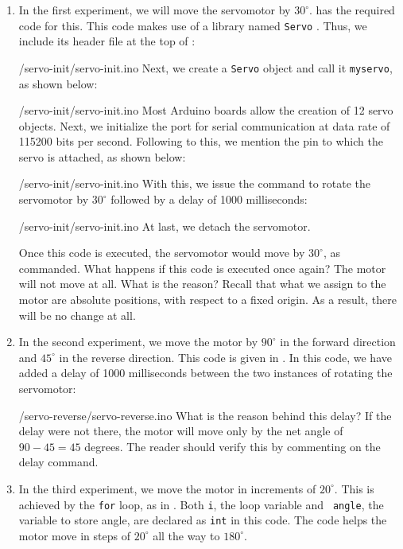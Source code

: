 \begin{enumerate}
  \item In the first experiment, we will move the servomotor by
        $30^\circ$.  has the required code for this.  
        This code makes use of a library named {\tt Servo} \cite{servo-lib}. 
        Thus, we include its header file at the top of :
        
        {\LocSERardcode/servo-init/servo-init.ino}
        Next, we create a {\tt Servo} object and call it {\tt myservo}, as shown below:
        
        {\LocSERardcode/servo-init/servo-init.ino}
        Most Arduino boards allow the creation of 12 servo objects. Next, we initialize the port for serial communication at
        data rate of 115200 bits per second. Following to this, we mention the 
        pin to which the servo is attached, as shown below:
        
        {\LocSERardcode/servo-init/servo-init.ino}
        With this, we issue the command to rotate the servomotor by $30^\circ$ followed by a delay of 
        1000 milliseconds:
        
        {\LocSERardcode/servo-init/servo-init.ino}
        At last, we  detach the servomotor.    
        
        Once this code is executed, the servomotor would move by
        $30^\circ$, as commanded.  What happens if this code is executed
        once again?  The motor will not move at all.  What is the reason?
        Recall that what we assign to the motor are absolute positions, with
        respect to a fixed origin.  As a result, there will be no change at
        all. 
        
  \item In the second experiment, we move the motor by $90^\circ$ in the
        forward direction and $45^\circ$ in the reverse direction.  This
        code is given in .  In this code, 
        we have added a delay of 1000 milliseconds between the two instances of 
        rotating the servomotor: 
        
        {\LocSERardcode/servo-reverse/servo-reverse.ino}
        What is the reason behind this delay?  If the delay were not
        there, the motor will move only by the net angle of $90-45 = 45$
        degrees.  The reader should verify this by commenting on the delay
        command.
        
  \item In the third experiment, we move the motor in increments of
        $20^\circ$.  This is achieved by the {\tt for} loop, as in
        .  Both {\tt i}, the loop variable and {\tt
            angle}, the variable to store angle, are declared as {\tt int} in
        this code.  The code helps the motor move in steps of $20^\circ$ all
        the way to $180^\circ$.  
        

\end{enumerate}
